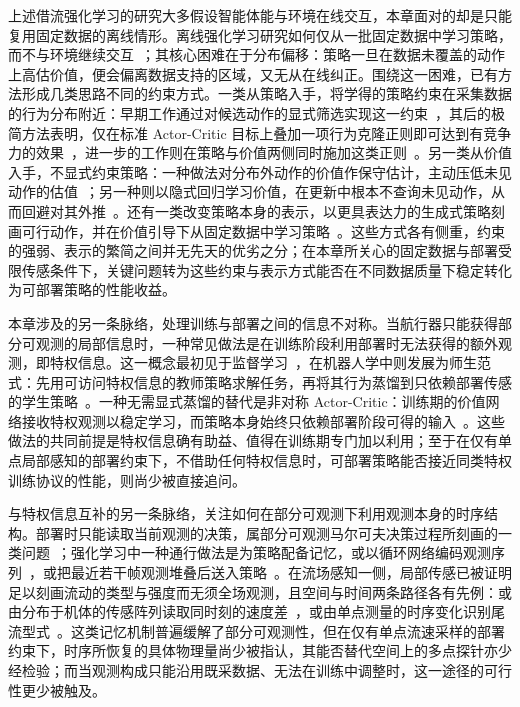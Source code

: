上述借流强化学习的研究大多假设智能体能与环境在线交互，本章面对的却是只能复用固定数据的离线情形。离线强化学习研究如何仅从一批固定数据中学习策略，而不与环境继续交互~\citep{levine2020offline}；其核心困难在于分布偏移：策略一旦在数据未覆盖的动作上高估价值，便会偏离数据支持的区域，又无从在线纠正。围绕这一困难，已有方法形成几类思路不同的约束方式。一类从策略入手，将学得的策略约束在采集数据的行为分布附近：早期工作通过对候选动作的显式筛选实现这一约束~\citep{fujimoto2019bcq}，其后的极简方法表明，仅在标准 Actor-Critic 目标上叠加一项行为克隆正则即可达到有竞争力的效果~\citep{fujimoto2021td3bc}，进一步的工作则在策略与价值两侧同时施加这类正则~\citep{tarasov2023rebrac}。另一类从价值入手，不显式约束策略：一种做法对分布外动作的价值作保守估计，主动压低未见动作的估值~\citep{kumar2020cql}；另一种则以隐式回归学习价值，在更新中根本不查询未见动作，从而回避对其外推~\citep{kostrikov2022iql}。还有一类改变策略本身的表示，以更具表达力的生成式策略刻画可行动作，并在价值引导下从固定数据中学习策略~\citep{park2025fql}。这些方式各有侧重，约束的强弱、表示的繁简之间并无先天的优劣之分；在本章所关心的固定数据与部署受限传感条件下，关键问题转为这些约束与表示方式能否在不同数据质量下稳定转化为可部署策略的性能收益。

本章涉及的另一条脉络，处理训练与部署之间的信息不对称。当航行器只能获得部分可观测的局部信息时，一种常见做法是在训练阶段利用部署时无法获得的额外观测，即特权信息。这一概念最初见于监督学习~\citep{vapnik2009lupi}，在机器人学中则发展为师生范式：先用可访问特权信息的教师策略求解任务，再将其行为蒸馏到只依赖部署传感的学生策略~\citep{chen2020lbc}。一种无需显式蒸馏的替代是非对称 Actor-Critic：训练期的价值网络接收特权观测以稳定学习，而策略本身始终只依赖部署阶段可得的输入~\citep{pinto2017asymmetric}。这些做法的共同前提是特权信息确有助益、值得在训练期专门加以利用；至于在仅有单点局部感知的部署约束下，不借助任何特权信息时，可部署策略能否接近同类特权训练协议的性能，则尚少被直接追问。

与特权信息互补的另一条脉络，关注如何在部分可观测下利用观测本身的时序结构。部署时只能读取当前观测的决策，属部分可观测马尔可夫决策过程所刻画的一类问题~\citep{kaelbling1998pomdp}；强化学习中一种通行做法是为策略配备记忆，或以循环网络编码观测序列~\citep{hausknecht2015drqn,heess2015recurrent}，或把最近若干帧观测堆叠后送入策略~\citep{mnih2015dqn}。在流场感知一侧，局部传感已被证明足以刻画流动的类型与强度而无须全场观测，且空间与时间两条路径各有先例：或由分布于机体的传感阵列读取同时刻的速度差~\citep{colvert2017local}，或由单点测量的时序变化识别尾流型式~\citep{colvert2018wakes}。这类记忆机制普遍缓解了部分可观测性，但在仅有单点流速采样的部署约束下，时序所恢复的具体物理量尚少被指认，其能否替代空间上的多点探针亦少经检验；而当观测构成只能沿用既采数据、无法在训练中调整时，这一途径的可行性更少被触及。

